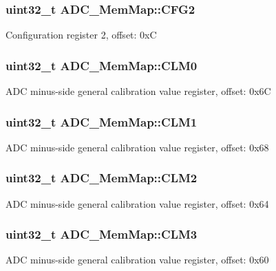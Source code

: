 \subsubsection[{C\+F\+G2}]{\setlength{\rightskip}{0pt plus 5cm}uint32\+\_\+t A\+D\+C\+\_\+\+Mem\+Map\+::\+C\+F\+G2}\label{struct_a_d_c___mem_map_aa39dedc8da290763fa121dc4c99dc5a4}
Configuration register 2, offset\+: 0x\+C \hypertarget{struct_a_d_c___mem_map_a1b8eeb87fa8308fe93200b6e82985c25}{}
\subsubsection[{C\+L\+M0}]{\setlength{\rightskip}{0pt plus 5cm}uint32\+\_\+t A\+D\+C\+\_\+\+Mem\+Map\+::\+C\+L\+M0}\label{struct_a_d_c___mem_map_a1b8eeb87fa8308fe93200b6e82985c25}
A\+D\+C minus-\/side general calibration value register, offset\+: 0x6\+C \hypertarget{struct_a_d_c___mem_map_a6c07d3719b54b23926239b53919f36d2}{}
\subsubsection[{C\+L\+M1}]{\setlength{\rightskip}{0pt plus 5cm}uint32\+\_\+t A\+D\+C\+\_\+\+Mem\+Map\+::\+C\+L\+M1}\label{struct_a_d_c___mem_map_a6c07d3719b54b23926239b53919f36d2}
A\+D\+C minus-\/side general calibration value register, offset\+: 0x68 \hypertarget{struct_a_d_c___mem_map_a2794a4dac3b6ec18535eeae7c7e2d4e3}{}
\subsubsection[{C\+L\+M2}]{\setlength{\rightskip}{0pt plus 5cm}uint32\+\_\+t A\+D\+C\+\_\+\+Mem\+Map\+::\+C\+L\+M2}\label{struct_a_d_c___mem_map_a2794a4dac3b6ec18535eeae7c7e2d4e3}
A\+D\+C minus-\/side general calibration value register, offset\+: 0x64 \hypertarget{struct_a_d_c___mem_map_a326c171566746f11f9b808930253df85}{}
\subsubsection[{C\+L\+M3}]{\setlength{\rightskip}{0pt plus 5cm}uint32\+\_\+t A\+D\+C\+\_\+\+Mem\+Map\+::\+C\+L\+M3}\label{struct_a_d_c___mem_map_a326c171566746f11f9b808930253df85}
A\+D\+C minus-\/side general calibration value register, offset\+: 0x60 \hypertarget{struct_a_d_c___mem_map_a7b8d8ae0f052a3824d3b34dffdf471e0}{}
